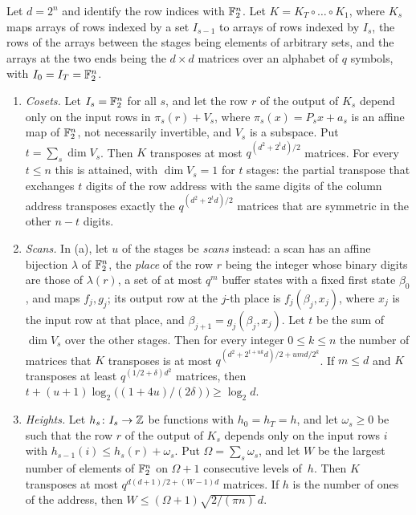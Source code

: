 \begin{proposition}[Stages]\label{prop:stages}
\notformalized
Let $d=2^n$ and identify the row indices with $\mathbb{F}_2^n$. Let $K=K_T\circ\dots\circ K_1$, where $K_s$ maps arrays of
rows indexed by a set $I_{s-1}$ to arrays of rows indexed by $I_s$, the rows of the arrays between the stages being
elements of arbitrary sets, and the arrays at the two ends being the $d\times d$ matrices over an alphabet of $q$
symbols, with $I_0=I_T=\mathbb{F}_2^n$.
\begin{enumerate}[label=(\alph*),leftmargin=2em]
\item \emph{Cosets.} Let $I_s=\mathbb{F}_2^n$ for all $s$, and let the row $r$ of the output of $K_s$ depend only on the
input rows in $\pi_s(r)+V_s$, where $\pi_s(x)=P_sx+a_s$ is an affine map of $\mathbb{F}_2^n$, not necessarily invertible, and
$V_s$ is a subspace. Put $t=\sum_s\dim V_s$. Then $K$ transposes at most $q^{(d^2+2^td)/2}$ matrices. For every
$t\le n$ this is attained, with $\dim V_s=1$ for $t$ stages: the partial transpose that exchanges $t$ digits of the
row address with the same digits of the column address transposes exactly the $q^{(d^2+2^td)/2}$ matrices that are
symmetric in the other $n-t$ digits.
\item \emph{Scans.} In (a), let $u$ of the stages be \emph{scans} instead: a scan has an affine bijection $\lambda$
of $\mathbb{F}_2^n$, the \emph{place} of the row $r$ being the integer whose binary digits are those of $\lambda(r)$, a set
of at most $q^m$ buffer states with a fixed
first state $\beta_0$, and maps $f_j,g_j$; its output row at the $j$-th place is $f_j(\beta_j,x_j)$, where $x_j$ is
the input row at that place, and $\beta_{j+1}=g_j(\beta_j,x_j)$. Let $t$ be the sum of $\dim V_s$ over the other
stages. Then for every integer $0\le k\le n$ the number of matrices that $K$ transposes is at most
$q^{(d^2+2^{t+uk}d)/2+umd/2^k}$. If $m\le d$ and $K$ transposes at least $q^{(1/2+\delta)d^2}$ matrices, then
$t+(u+1)\log_2\bigl((1+4u)/(2\delta)\bigr)\ge\log_2d$.
\item \emph{Heights.} Let $h_s\colon I_s\to\mathbb{Z}$ be functions with $h_0=h_T=h$, and let $\omega_s\ge0$ be such that the
row $r$ of the output of $K_s$ depends only on the input rows $i$ with $h_{s-1}(i)\le h_s(r)+\omega_s$. Put
$\Omega=\sum_s\omega_s$, and let $W$ be the largest number of elements of $\mathbb{F}_2^n$ on $\Omega+1$ consecutive levels
of~$h$. Then $K$ transposes at most $q^{d(d+1)/2+(W-1)d}$ matrices. If $h$ is the number of ones of the address,
then $W\le(\Omega+1)\sqrt{2/(\pi n)}\,d$.
\end{enumerate}
\end{proposition}

